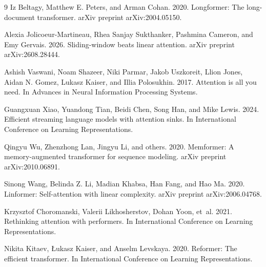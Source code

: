 \documentclass[letterpaper]{article}
\begin{document}
\begin{thebibliography}{9}
Iz Beltagy, Matthew E. Peters, and Arman Cohan. 2020. Longformer: The long-document transformer. arXiv preprint arXiv:2004.05150.

Alexia Jolicoeur-Martineau, Rhea Sanjay Sukthanker, Pashmina Cameron, and Emy Gervais. 2026. Sliding-window beats linear attention. arXiv preprint arXiv:2608.28444.

Ashish Vaswani, Noam Shazeer, Niki Parmar, Jakob Uszkoreit, Llion Jones, Aidan N. Gomez, Lukasz Kaiser, and Illia Polosukhin. 2017. Attention is all you need. In Advances in Neural Information Processing Systems.

Guangxuan Xiao, Yuandong Tian, Beidi Chen, Song Han, and Mike Lewis. 2024. Efficient streaming language models with attention sinks. In International Conference on Learning Representations.

Qingyu Wu, Zhenzhong Lan, Jingyu Li, and others. 2020. Memformer: A memory-augmented transformer for sequence modeling. arXiv preprint arXiv:2010.06891.

Sinong Wang, Belinda Z. Li, Madian Khabsa, Han Fang, and Hao Ma. 2020. Linformer: Self-attention with linear complexity. arXiv preprint arXiv:2006.04768.

Krzysztof Choromanski, Valerii Likhosherstov, Dohan Yoon, et~al. 2021. Rethinking attention with performers. In International Conference on Learning Representations.

Nikita Kitaev, Łukasz Kaiser, and Anselm Levskaya. 2020. Reformer: The efficient transformer. In International Conference on Learning Representations.
\end{thebibliography}
\end{document}
